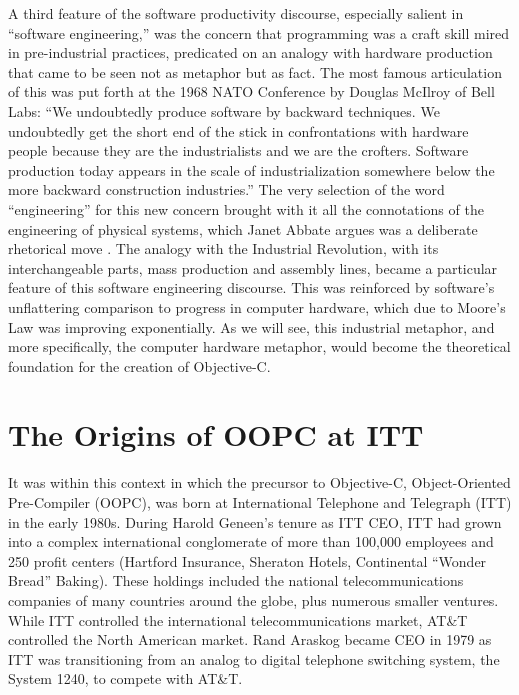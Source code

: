 \documentclass[acmsmall]{acmart}\settopmatter{}
\begin{document}
A third feature of the software productivity discourse, especially salient in ``software engineering,'' was the concern that programming was a craft skill mired in pre-industrial practices, predicated on an analogy with hardware production that came to be seen not as metaphor but as fact. The most famous articulation of this was put forth at the 1968 NATO Conference by Douglas McIlroy of Bell Labs: ``We undoubtedly produce software by backward techniques. We undoubtedly get the short end of the stick in confrontations with hardware people because they are the industrialists and we are the crofters. Software production today appears in the scale of industrialization somewhere below the more backward construction industries.'' \citep[11]{mahoney_finding_2004} The very selection of the word ``engineering'' for this new concern brought with it all the connotations of the engineering of physical systems, which Janet Abbate argues was a deliberate rhetorical move \citep[97--105]{abbate_software_2012}. The analogy with the Industrial Revolution, with its interchangeable parts, mass production and assembly lines, became a particular feature of this software engineering discourse. This was reinforced by software's unflattering comparison to progress in computer hardware, which due to Moore's Law was improving exponentially. As we will see, this industrial metaphor, and more specifically, the computer hardware metaphor, would become the theoretical foundation for the creation of Objective-C. 

\section{The Origins of OOPC at ITT}
\label{sec-OOPC@ITT}
It was within this context in which the precursor to Objective-C, Object-Oriented Pre-Compiler (OOPC), was born at International Telephone and Telegraph (ITT) in the early 1980s. During Harold Geneen's tenure as ITT CEO, ITT had grown into a complex international conglomerate of more than 100,000 employees and 250 profit centers (Hartford Insurance, Sheraton Hotels, Continental ``Wonder Bread'' Baking). These holdings included the national telecommunications companies of many countries around the globe, plus numerous smaller ventures. While ITT controlled the international telecommunications market, AT\&T controlled the North American market. Rand Araskog became CEO in 1979 as ITT was transitioning from an analog to digital telephone switching system, the System 1240, to compete with AT\&T.
\end{document}
